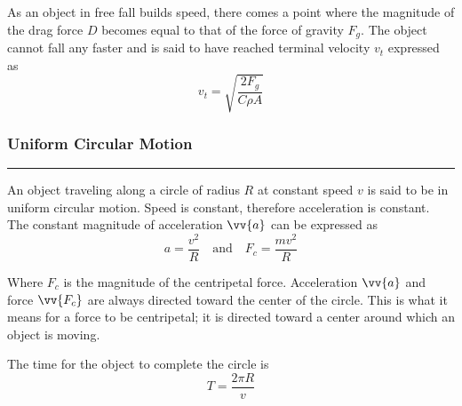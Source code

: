 \documentclass{article}
\begin{document}
    \smallskip\noindent
    As an object in free fall builds speed, there comes a point where the magnitude of the drag force ${D}$ becomes equal to that of the force of gravity $F_g$.
    The object cannot fall any faster and is said to have reached terminal velocity $v_t$ expressed as
    \[
        v_t = \sqrt{\frac{2F_g}{C\rho A}}
    \]

    \smallskip
    \subsubsection*{Uniform Circular Motion}
    \vspace{-1em}
    \rule{\linewidth}{.1mm}

    \smallskip\noindent
    An object traveling along a circle of radius $R$ at constant speed $v$ is said to be in uniform circular motion.
    Speed is constant, therefore acceleration is constant.
    The constant magnitude of acceleration $\vv{a}$ can be expressed as
    \[
        a=\frac{v^2}{R} \quad \text{and} \quad F_c=\frac{mv^2}{R}
    \]

    \smallskip\noindent
    Where $F_c$ is the magnitude of the centripetal force.
    Acceleration $\vv{a}$ and force $\vv{F_c}$ are always directed toward the center of the circle.
    This is what it means for a force to be centripetal; it is directed toward a center around which an object is moving.

    \medskip\noindent
    The time for the object to complete the circle is
    \[
        T = \frac{2\pi R}{v}
    \]
\end{document}
